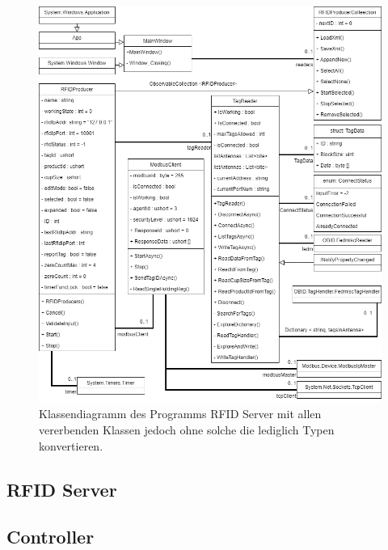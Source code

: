     \begin{figure}[ht]
        \label{fig:figure8}
        \includegraphics[width = \textwidth ]{Bilder/RFID_Klassendiagramm}
        \caption[Klassendiagramm des Programms RFID Server ]
        {\small Klassendiagramm des Programms RFID Server mit allen vererbenden Klassen jedoch ohne solche die
        lediglich Typen konvertieren.}
        \centering
    \end{figure}

    \subsection {RFID Server}

    \subsection {Controller}

